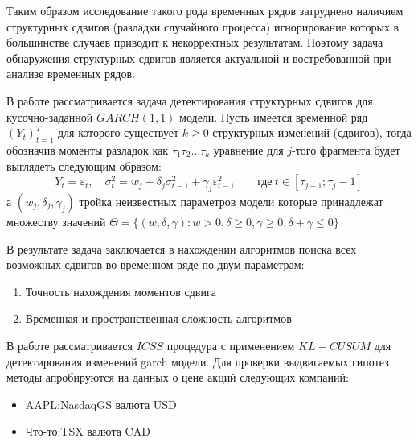\documentclass[a4paper,14pt,russian]{extarticle}
\begin{document}
	\par
	Таким образом исследование такого рода временных рядов затруднено наличием структурных сдвигов (разладки случайного процесса) игнорирование которых в большинстве случаев приводит к некорректных результатам. Поэтому задача обнаружения структурных сдвигов является актуальной и востребованной при анализе временных рядов.
	\par
	В работе рассматривается задача детектирования структурных сдвигов для кусочно-заданной $GARCH(1, 1)$ модели. Пусть имеется временной ряд $(Y_t)_{t=1}^T$ для которого существует $k \geq 0$ структурных изменений (сдвигов), тогда обозначив моменты разладок как $\tau_1 \tau_2 \dots \tau_k$ уравнение для $j$-того фрагмента будет выглядеть следующим образом:
	\begin{equation}
		Y_t = \varepsilon_t, \quad \sigma_t^2 = w_j + \delta_j \sigma_{t-1}^2 + \gamma_j \varepsilon_{t-1}^2 \qquad \text{где} \ t \in \left[ \tau_{j - 1}; \tau_j - 1 \right] 
	\end{equation}
	а $(w_j, \delta_j, \gamma_j)$ тройка неизвестных параметров модели которые принадлежат множеству значений $\Theta = \{ (w, \delta, \gamma): w > 0, \delta \geq 0, \gamma \geq 0, \delta + \gamma \le 0 \} $
	\par
	В результате задача заключается в нахождении алгоритмов поиска всех возможных сдвигов во временном ряде по двум параметрам:
	\begin{enumerate}
		\item Точность нахождения моментов сдвига
		\item Временная и пространственная сложность алгоритмов
	\end{enumerate}
	\par
	В работе рассматривается $ICSS$ процедура с применением $KL-CUSUM$ для детектирования изменений garch модели. Для проверки выдвигаемых гипотез методы апробируются на данных о цене акций следующих компаний:
	\begin{itemize}
		\item AAPL:NasdaqGS валюта USD
		\item Что-то:TSX валюта CAD
	\end{itemize}
	
	
	\clearpage
\end{document}

